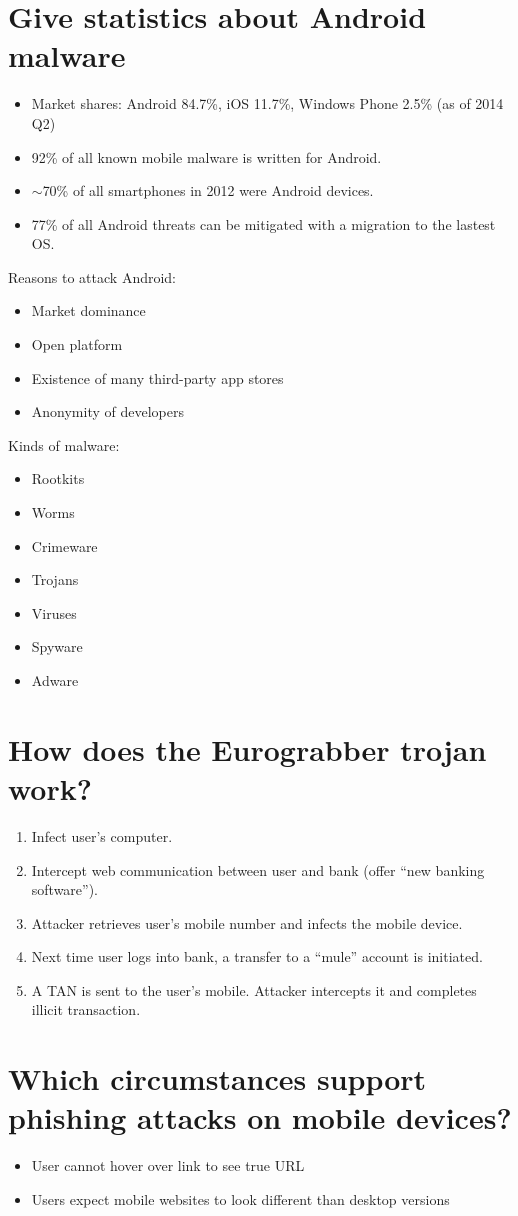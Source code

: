 \documentclass[twocolumn]{article}
\newcommand{\question}[1]{\section{#1}}
\begin{document}
\question{Give statistics about Android malware}
%
\begin{itemize}
  \item Market shares: Android 84.7\%, iOS 11.7\%, Windows Phone 2.5\% (as of 2014 Q2)
  \item 92\% of all known mobile malware is written for Android.
  \item $\sim$70\% of all smartphones in 2012 were Android devices.
  \item 77\% of all Android threats can be mitigated with a migration to the lastest OS.
\end{itemize}

Reasons to attack Android:
\begin{itemize}
  \item Market dominance
  \item Open platform
  \item Existence of many third-party app stores
  \item Anonymity of developers
\end{itemize}

Kinds of malware:
\begin{itemize}
  \item Rootkits
  \item Worms
  \item Crimeware
  \item Trojans
  \item Viruses
  \item Spyware
  \item Adware
\end{itemize}

\question{How does the Eurograbber trojan work?}
%
\begin{enumerate}
  \item Infect user's computer.
  \item Intercept web communication between user and bank (offer ``new banking software'').
  \item Attacker retrieves user's mobile number and infects the mobile device.
  \item Next time user logs into bank, a transfer to a ``mule'' account is initiated.
  \item A TAN is sent to the user's mobile. Attacker intercepts it and completes illicit transaction.
\end{enumerate}

\question{Which circumstances support phishing attacks on mobile devices?}
%
\begin{itemize}
  \item User cannot hover over link to see true URL
  \item Users expect mobile websites to look different than desktop versions
\end{itemize}
\end{document}
